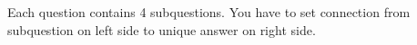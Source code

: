 \documentclass{report}
\begin{document}



\chapter{}
Each question contains 4 subquestions. You have to set connection from subquestion on left side to unique answer on right side.\\\\
\end{document}
